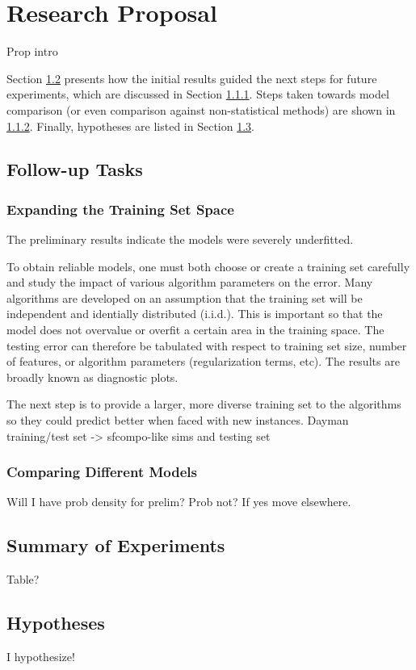 \chapter{Research Proposal}
\label{ch:proposal}

Prop intro

Section \ref{sec:summary} presents how the initial results guided the next
steps for future experiments, which are discussed in Section
\ref{sec:newtrain}. Steps taken towards model comparison (or even comparison
against non-statistical methods) are shown in \ref{sec:compare}.  Finally, hypotheses are listed in Section
\ref{sec:hypotheses}.

\section{Follow-up Tasks}
\label{sec:tasks}

\subsection{Expanding the Training Set Space}
\label{sec:newtrain}

The preliminary results indicate the models were severely underfitted.

To obtain reliable models, one must both choose or create a training set
carefully and study the impact of various algorithm parameters on the error.
Many algorithms are developed on an assumption that the training set will be
independent and identially distributed (i.i.d.). This is important so that the
model does not overvalue or overfit a certain area in the training space. The
testing error can therefore be tabulated with respect to training set size,
number of features, or algorithm parameters (regularization terms, etc). The
results are broadly known as diagnostic plots. 

The next step is to provide a larger, more diverse training set to the
algorithms so they could predict better when faced with new instances.  Dayman
training/test set -> sfcompo-like sims and testing set

\subsection{Comparing Different Models}
\label{sec:compare}

Will I have prob density for prelim? Prob not? If yes move elsewhere.

\section{Summary of Experiments}
\label{sec:summary}

Table?

\section{Hypotheses}
\label{sec:hypotheses}

I hypothesize!



